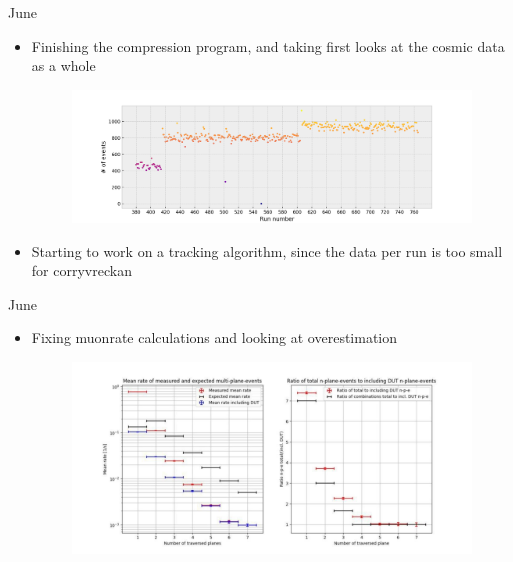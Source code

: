\documentclass{beamer}
\begin{document}
\begin{frame}{June}
    \begin{itemize}
	\item Finishing the compression program, and taking first looks at the
	    cosmic data as a whole
	    \begin{figure}[H]
		\centering
		\includegraphics[width=.9\textwidth]{MauriceFirstLookCosmics.png}
	    \end{figure}
	\item Starting to work on a tracking algorithm, since the data per run
	    is too small for corryvreckan
    \end{itemize}
\end{frame}

\begin{frame}{June}
    \begin{itemize}
	\item Fixing muonrate calculations and looking at overestimation
	    \begin{figure}[H]
		\centering
		\includegraphics[width=.9\textwidth]{DavidOverestimation.jpg}
	    \end{figure}
    \end{itemize}
\end{frame}
\end{document}
